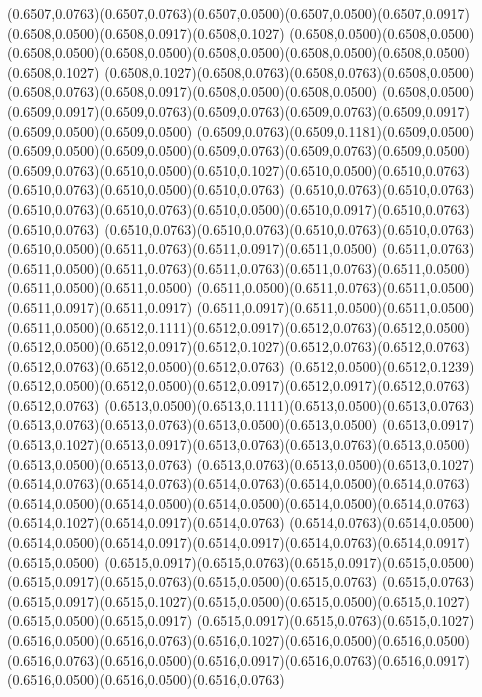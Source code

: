 (0.6507,0.0763)(0.6507,0.0763)(0.6507,0.0500)(0.6507,0.0500)(0.6507,0.0917)(0.6508,0.0500)(0.6508,0.0917)(0.6508,0.1027)
(0.6508,0.0500)(0.6508,0.0500)(0.6508,0.0500)(0.6508,0.0500)(0.6508,0.0500)(0.6508,0.0500)(0.6508,0.0500)(0.6508,0.1027)
(0.6508,0.1027)(0.6508,0.0763)(0.6508,0.0763)(0.6508,0.0500)(0.6508,0.0763)(0.6508,0.0917)(0.6508,0.0500)(0.6508,0.0500)
(0.6508,0.0500)(0.6509,0.0917)(0.6509,0.0763)(0.6509,0.0763)(0.6509,0.0763)(0.6509,0.0917)(0.6509,0.0500)(0.6509,0.0500)
(0.6509,0.0763)(0.6509,0.1181)(0.6509,0.0500)(0.6509,0.0500)(0.6509,0.0500)(0.6509,0.0763)(0.6509,0.0763)(0.6509,0.0500)
(0.6509,0.0763)(0.6510,0.0500)(0.6510,0.1027)(0.6510,0.0500)(0.6510,0.0763)(0.6510,0.0763)(0.6510,0.0500)(0.6510,0.0763)
(0.6510,0.0763)(0.6510,0.0763)(0.6510,0.0763)(0.6510,0.0763)(0.6510,0.0500)(0.6510,0.0917)(0.6510,0.0763)(0.6510,0.0763)
(0.6510,0.0763)(0.6510,0.0763)(0.6510,0.0763)(0.6510,0.0763)(0.6510,0.0500)(0.6511,0.0763)(0.6511,0.0917)(0.6511,0.0500)
(0.6511,0.0763)(0.6511,0.0500)(0.6511,0.0763)(0.6511,0.0763)(0.6511,0.0763)(0.6511,0.0500)(0.6511,0.0500)(0.6511,0.0500)
(0.6511,0.0500)(0.6511,0.0763)(0.6511,0.0500)(0.6511,0.0917)(0.6511,0.0917)
\PST@Solid(0.6511,0.0917)(0.6511,0.0500)(0.6511,0.0500)(0.6511,0.0500)(0.6512,0.1111)(0.6512,0.0917)(0.6512,0.0763)(0.6512,0.0500)
(0.6512,0.0500)(0.6512,0.0917)(0.6512,0.1027)(0.6512,0.0763)(0.6512,0.0763)(0.6512,0.0763)(0.6512,0.0500)(0.6512,0.0763)
(0.6512,0.0500)(0.6512,0.1239)(0.6512,0.0500)(0.6512,0.0500)(0.6512,0.0917)(0.6512,0.0917)(0.6512,0.0763)(0.6512,0.0763)
(0.6513,0.0500)(0.6513,0.1111)(0.6513,0.0500)(0.6513,0.0763)(0.6513,0.0763)(0.6513,0.0763)(0.6513,0.0500)(0.6513,0.0500)
(0.6513,0.0917)(0.6513,0.1027)(0.6513,0.0917)(0.6513,0.0763)(0.6513,0.0763)(0.6513,0.0500)(0.6513,0.0500)(0.6513,0.0763)
(0.6513,0.0763)(0.6513,0.0500)(0.6513,0.1027)(0.6514,0.0763)(0.6514,0.0763)(0.6514,0.0763)(0.6514,0.0500)(0.6514,0.0763)
(0.6514,0.0500)(0.6514,0.0500)(0.6514,0.0500)(0.6514,0.0500)(0.6514,0.0763)(0.6514,0.1027)(0.6514,0.0917)(0.6514,0.0763)
(0.6514,0.0763)(0.6514,0.0500)(0.6514,0.0500)(0.6514,0.0917)(0.6514,0.0917)(0.6514,0.0763)(0.6514,0.0917)(0.6515,0.0500)
(0.6515,0.0917)(0.6515,0.0763)(0.6515,0.0917)(0.6515,0.0500)(0.6515,0.0917)(0.6515,0.0763)(0.6515,0.0500)(0.6515,0.0763)
(0.6515,0.0763)(0.6515,0.0917)(0.6515,0.1027)(0.6515,0.0500)(0.6515,0.0500)(0.6515,0.1027)(0.6515,0.0500)(0.6515,0.0917)
(0.6515,0.0917)(0.6515,0.0763)(0.6515,0.1027)(0.6516,0.0500)(0.6516,0.0763)(0.6516,0.1027)(0.6516,0.0500)(0.6516,0.0500)
(0.6516,0.0763)(0.6516,0.0500)(0.6516,0.0917)(0.6516,0.0763)(0.6516,0.0917)(0.6516,0.0500)(0.6516,0.0500)(0.6516,0.0763)
